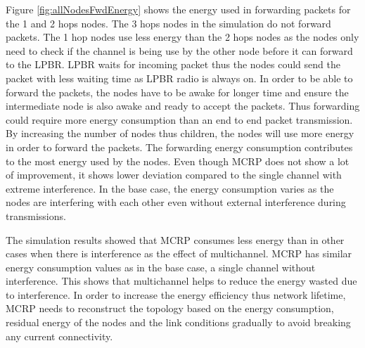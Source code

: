 Figure \ref{fig:allNodesFwdEnergy} shows the energy used in forwarding packets for the 1 and 2 hops nodes. The 3 hops nodes in the simulation do not forward packets. The 1 hop nodes use less energy than the 2 hops nodes as the nodes only need to check if the channel is being use by the other node before it can forward to the LPBR. LPBR waits for incoming packet thus the nodes could send the packet with less waiting time as LPBR radio is always on. 
In order to be able to forward the packets, the nodes have to be awake for longer time and ensure the intermediate node is also awake and ready to accept the packets. Thus forwarding could require more energy consumption than an end to end packet transmission. By increasing the number of nodes thus children, the nodes will use more energy in order to forward the packets. The forwarding energy consumption contributes to the most energy used by the nodes.  
Even though MCRP does not show a lot of improvement, it shows lower deviation compared to the single channel with extreme interference.
In the base case, the energy consumption varies as the nodes are interfering with each other even without external interference during transmissions.

The simulation results showed that MCRP consumes less energy than in other cases when there is interference as the effect of multichannel. MCRP has similar energy consumption values as in the base case, a single channel without interference. This shows that multichannel helps to reduce the energy wasted due to interference. In order to increase the energy efficiency thus network lifetime, MCRP needs to reconstruct the topology based on the energy consumption, residual energy of the nodes and the link conditions gradually to avoid breaking any current connectivity.
